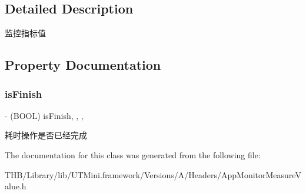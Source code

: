 \subsection{Detailed Description}
监控指标值 

\subsection{Property Documentation}
\mbox{\label{interface_app_monitor_measure_value_a96e491c9a716f5347694bec46341bdc7}} 
\subsubsection{\texorpdfstring{is\+Finish}{isFinish}}
{\footnotesize\ttfamily -\/ (B\+O\+OL) is\+Finish\hspace{0.3cm}{\ttfamily [read]}, {\ttfamily [write]}, {\ttfamily [nonatomic]}, {\ttfamily [assign]}}

耗时操作是否已经完成 

The documentation for this class was generated from the following file\+:\begin{DoxyCompactItemize}
\item 
T\+H\+B/\+Library/lib/\+U\+T\+Mini.\+framework/\+Versions/\+A/\+Headers/App\+Monitor\+Measure\+Value.\+h\end{DoxyCompactItemize}
